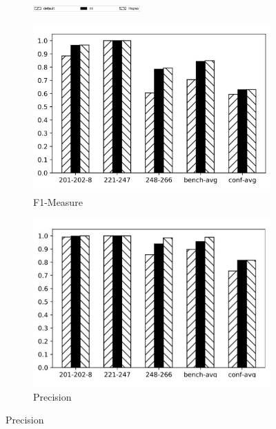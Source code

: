 \documentclass[twoside]{article}
\begin{document}
\begin{figure}[htb!]\centering
\begin{subfigure}{\textwidth}
	\centering
\includegraphics[width=0.45\textwidth]{figures/t_legend.jpg}
\end{subfigure}
\begin{subfigure}{0.3\textwidth}
	\centering
\includegraphics[width=\textwidth]{data_figs/MulRegress_RiMOM_F1.pdf}
\caption{F1-Measure}
\label{fig:MultiRegress_RiMOM_F1-Measure}
\end{subfigure}
\begin{subfigure}{0.3\textwidth}
	\centering
\includegraphics[width=\textwidth]{data_figs/MulRegress_RiMOM_P.pdf}
\caption{Precision}

\end{subfigure}
\end{figure}
\end{document}
